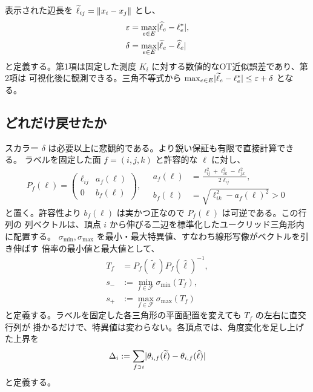 表示された辺長を $\widetilde\ell_{ij}=\lVert x_i-x_j\rVert$ とし、
\begin{align}
 \varepsilon
 &=\max_{e\in E}\lvert \widehat\ell_e-\ell_e^*\rvert,
 \label{eq:ot-error}\\
 \delta
 &=\max_{e\in E}\lvert \widetilde\ell_e-\widehat\ell_e\rvert
 \label{eq:display-error}
\end{align}
と定義する。第1項は固定した測度 $K_i$ に対する数値的なOT近似誤差であり、第2項は
可視化後に観測できる。三角不等式から
$\max_{e\in E}\lvert \widetilde\ell_e-\ell_e^*\rvert\le\varepsilon+\delta$ となる。

\subsection{どれだけ戻せたか}
\label{sec:certificate}

スカラー $\delta$ は必要以上に悲観的である。より鋭い保証も有限で直接計算できる。
ラベルを固定した面 $f=(i,j,k)$ と許容的な $\ell$ に対し、
\begin{equation}
 P_f(\ell)=
 \begin{pmatrix}
  \ell_{ij} & a_f(\ell)\\
  0 & b_f(\ell)
 \end{pmatrix},
 \quad
 \begin{aligned}
 a_f(\ell)&=\frac{\ell_{ij}^2+\ell_{ik}^2-\ell_{jk}^2}
 {2\ell_{ij}},\\
 b_f(\ell)&=\sqrt{\ell_{ik}^2-a_f(\ell)^2}>0
 \end{aligned}
 \label{eq:canonical-triangle}
\end{equation}
と置く。許容性より $b_f(\ell)$ は実かつ正なので $P_f(\ell)$ は可逆である。この行列の
列ベクトルは、頂点 $i$ から伸びる二辺を標準化したユークリッド三角形内に配置する。
$\sigma_{\min},\sigma_{\max}$ を最小・最大特異値、すなわち線形写像がベクトルを引き伸ばす
倍率の最小値と最大値として、
\begin{equation}
 \begin{aligned}
 T_f&=P_f(\widetilde\ell)P_f(\widehat\ell)^{-1},\\
 s_-&:=\min_{f\in\mathcal F}\sigma_{\min}(T_f),\\
 s_+&:=\max_{f\in\mathcal F}\sigma_{\max}(T_f)
 \end{aligned}
 \label{eq:face-distortion}
\end{equation}
と定義する。ラベルを固定した各三角形の平面配置を変えても $T_f$ の左右に直交行列が
掛かるだけで、特異値は変わらない。各頂点では、角度変化を足し上げた上界を
\begin{equation}
 \Delta_i:=\sum_{f\ni i}
 \lvert \theta_{i,f}(\widetilde\ell)-
       \theta_{i,f}(\widehat\ell)\rvert
 \label{eq:posterior-only-certificate}
\end{equation}
と定義する。

